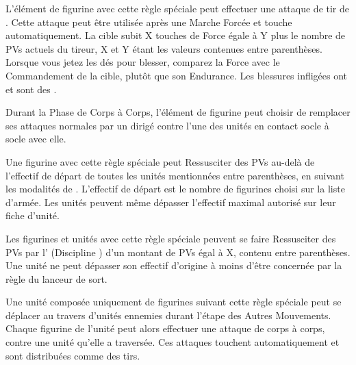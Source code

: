 


L'élément de figurine avec cette règle spéciale peut effectuer une attaque  de tir de . Cette attaque peut être utilisée après une Marche Forcée et touche automatiquement. La cible subit X touches de Force égale à Y plus le nombre de PVs actuels du tireur, X et Y étant les valeurs contenues entre parenthèses. Lorsque vous jetez les dés pour blesser, comparez la Force avec le Commandement de la cible, plutôt que son Endurance. Les blessures infligées ont  et sont des \magicalattacks{}.

Durant la Phase de Corps à Corps, l'élément de figurine peut choisir de remplacer ses attaques normales par un \chillingshriek{} dirigé contre l'une des unités en contact socle à socle avec elle.


Une figurine avec cette règle spéciale peut Ressusciter des PVs au-delà de l'effectif de départ de toutes les unités mentionnées entre parenthèses, en suivant les modalités de \raisewounds{}. L'effectif de départ est le nombre de figurines choisi sur la liste d'armée. Les unités peuvent même dépasser l'effectif maximal autorisé sur leur fiche d'unité.


Les figurines et unités avec cette règle spéciale peuvent se faire Ressusciter des PVs par l'\necromancysignaturespell{} (Discipline \necromancy{}) d'un montant de PVs égal à X, contenu entre parenthèses. Une unité ne peut dépasser son effectif d'origine à moins d'être concernée par la règle \awaken{} du lanceur de sort.

\armyspecialruleentry{\reaper}

Une unité composée uniquement de figurines suivant cette règle spéciale peut se déplacer au travers d'unités ennemies durant l'étape des Autres Mouvements. Chaque figurine de l'unité peut alors effectuer une attaque de corps à corps, contre une unité qu'elle a traversée. Ces attaques touchent automatiquement et sont distribuées comme des tirs.

